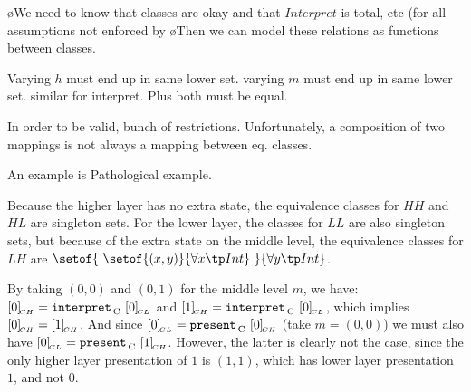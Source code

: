 
\toHere
\bl
\o We need to know that classes are okay and that $Interpret$ is total, etc (for all assumptions not enforced by 
\o Then we can model these relations as functions between classes.
\el

Varying $h$ must end up in same lower set. varying $m$ must end up in same lower set.
similar for interpret. Plus both must be equal.

In order to be valid, bunch of restrictions.
Unfortunately, a composition of two mappings is not always a mapping between eq. classes.

An example is 
Pathological example.
\fromHere


Because the higher layer has no extra state, the equivalence classes for $HH$ and $HL$ are singleton sets. For the lower layer, the classes for $LL$ are also singleton sets, but because of the extra state on the middle level, the equivalence classes for $LH$ are $\setof{~\setof{(x,y)}{\forall x \tp Int}~}{\forall y \tp Int}$.

By taking $(0,0)$ and $(0,1)$ for the middle level $m$, we have: $[{0}]_{{\!_{CH}}} = {\tt interpret}_{\, \mathrm C}~[{0}]_{{\!_{CL}}}$ and $[{1}]_{{\!_{CH}}} = {\tt interpret}_{\, \mathrm C}~[{0}]_{{\!_{CL}}}$, which implies $[{0}]_{{\!_{CH}}} = [{1}]_{{\!_{CH}}}$. And since  $[{0}]_{{\!_{CL}}} = {\tt present}_{\, \mathrm C}~[{0}]_{{\!_{CH}}}$ (take $m = (0,0)$) we must also have $[{0}]_{{\!_{CL}}} = {\tt present}_{\, \mathrm C}~[{1}]_{{\!_{CH}}}$. However, the latter is clearly not the case, since the only higher layer presentation of $1$ is $(1,1)$, which has lower layer presentation $1$, and not $0$.


